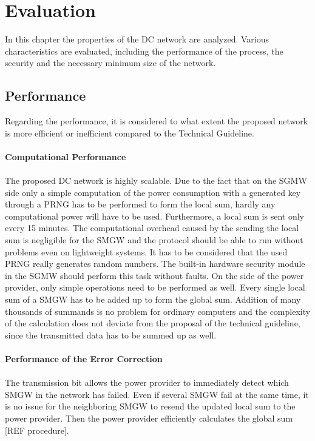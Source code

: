 

\section{Evaluation}
\label{Evaluation}
In this chapter the properties of the DC network are analyzed. Various characteristics are evaluated, including the performance of the process, the security and the necessary minimum size of the network.
\subsection{Performance}
Regarding the performance, it is considered to what extent the proposed network is more efficient or inefficient compared to the Technical Guideline.
\\
\\
\textbf{Computational Performance}
\\
\\
The proposed DC network is highly scalable. Due to the fact that on the SGMW side only a simple computation of the power consumption with a generated key through a PRNG has to be performed to form the local sum, hardly any computational power will have to be used. Furthermore, a local sum is sent only every 15 minutes. The computational overhead caused by the sending the local sum is negligible for the SMGW and the protocol should be able to run without problems even on lightweight systems. It has to be considered that the used PRNG really generates random numbers. The built-in hardware security module in the SGMW should perform this task without faults. On the side of the power provider, only simple operations need to be performed as well. Every single local sum of a SMGW has to be added up to form the global sum. Addition of many thousands of summands is no problem for ordinary computers and the complexity of the calculation does not deviate from the proposal of the technical guideline, since the transmitted data has to be summed up as well.\\
\\
\textbf{Performance of the Error Correction}
\\
\\
The transmission bit allows the power provider to immediately detect which SMGW in the network has failed. Even if several SMGW fail at the same time, it is no issue for the neighboring SMGW to resend the updated local sum to the power provider. Then the power provider efficiently calculates the global sum [REF procedure]. \\

